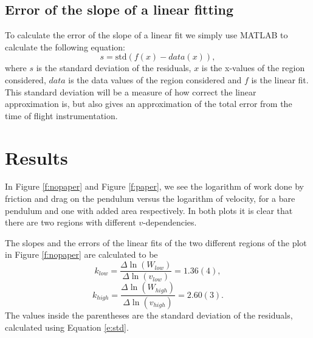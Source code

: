 \documentclass[11pt, a4paper]{article}
\begin{document}
\subsection{Error of the slope of a linear fitting}
To calculate the error of the slope of a linear fit we simply use MATLAB to 
calculate the following equation:
\begin{equation}
	s = \text{std}(f(x)-data(x)),
	\label{e:std}
\end{equation}
where $s$ is the standard deviation of the residuals, $x$ is the x-values of the region considered, 
$data$ is the data values of the region considered and $f$ is the linear fit.
This standard deviation will be a measure of how correct the linear approximation is, 
but also gives an approximation of the total error from the time of flight instrumentation.

\section{Results}
In Figure \ref{f:nopaper} and Figure \ref{f:paper}, we see the logarithm of work done by friction and drag on the pendulum versus the logarithm of velocity, for a bare pendulum and one
with added area respectively. In both plots it is clear that there are two regions with different $v$-dependencies. 

The slopes and the errors of the linear fits of the two different regions of the plot in Figure \ref{f:nopaper} are calculated to be
\[
	k_{low} = \frac{\Delta\ln(W_{low})}{\Delta\ln(v_{low})} = 1.36(4),
\]
\[
	k_{high} = \frac{\Delta\ln(W_{high})}{\Delta\ln(v_{high})} = 2.60(3).
\]
The values inside the parentheses are the standard deviation of the residuals, calculated using Equation \ref{e:std}.
\end{document}
